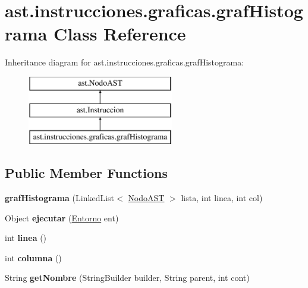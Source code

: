 \hypertarget{classast_1_1instrucciones_1_1graficas_1_1graf_histograma}{}\section{ast.\+instrucciones.\+graficas.\+graf\+Histograma Class Reference}
\label{classast_1_1instrucciones_1_1graficas_1_1graf_histograma}
Inheritance diagram for ast.\+instrucciones.\+graficas.\+graf\+Histograma\+:\begin{figure}[H]
\begin{center}
\leavevmode
\includegraphics[height=3.000000cm]{classast_1_1instrucciones_1_1graficas_1_1graf_histograma}
\end{center}
\end{figure}
\subsection*{Public Member Functions}
\begin{DoxyCompactItemize}
\item 
\mbox{\label{classast_1_1instrucciones_1_1graficas_1_1graf_histograma_a1dc9fead227728978dd651250d612ee6}} 
{\bfseries graf\+Histograma} (Linked\+List$<$ \mbox{\hyperlink{interfaceast_1_1_nodo_a_s_t}{Nodo\+A\+ST}} $>$ lista, int linea, int col)
\item 
\mbox{\label{classast_1_1instrucciones_1_1graficas_1_1graf_histograma_aa90322ce25d7c052b64df2c67dee9be8}} 
Object {\bfseries ejecutar} (\mbox{\hyperlink{classentorno_1_1_entorno}{Entorno}} ent)
\item 
\mbox{\label{classast_1_1instrucciones_1_1graficas_1_1graf_histograma_a88b559e820cb76ec36734cbf982fefba}} 
int {\bfseries linea} ()
\item 
\mbox{\label{classast_1_1instrucciones_1_1graficas_1_1graf_histograma_a79ac6464c124223eb53b2233a041415b}} 
int {\bfseries columna} ()
\item 
\mbox{\label{classast_1_1instrucciones_1_1graficas_1_1graf_histograma_a9138e575238f4a165f1531e0341c4e6e}} 
String {\bfseries get\+Nombre} (String\+Builder builder, String parent, int cont)
\end{DoxyCompactItemize}


